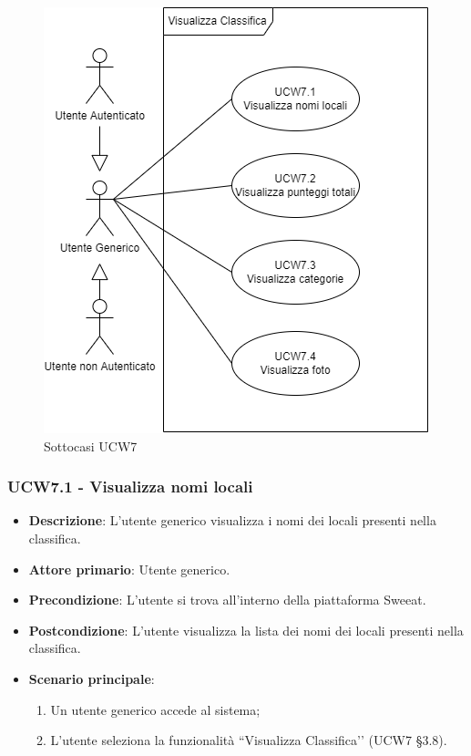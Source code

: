 \begin{figure}[H]
    \centering
        \includegraphics[scale=0.5]{UC_images/UCW7-1.png}
        \caption{Sottocasi UCW7}
\end{figure}

\subsubsection{UCW7.1 - Visualizza nomi locali}
\begin{itemize}
	\item \textbf{Descrizione}: L'utente generico visualizza i nomi dei locali presenti nella classifica.
    \item \textbf{Attore primario}: Utente generico.
    \item \textbf{Precondizione}: L’utente si trova all’interno della piattaforma Sweeat.
    \item \textbf{Postcondizione}: L’utente visualizza la lista dei nomi dei locali presenti nella classifica.
    \item \textbf{Scenario principale}: 
    \begin{enumerate}
        \item Un utente generico accede al sistema;
        \item L’utente seleziona la funzionalità “Visualizza Classifica’’ (UCW7 \S{}3.8).
    \end{enumerate}
\end{itemize}

